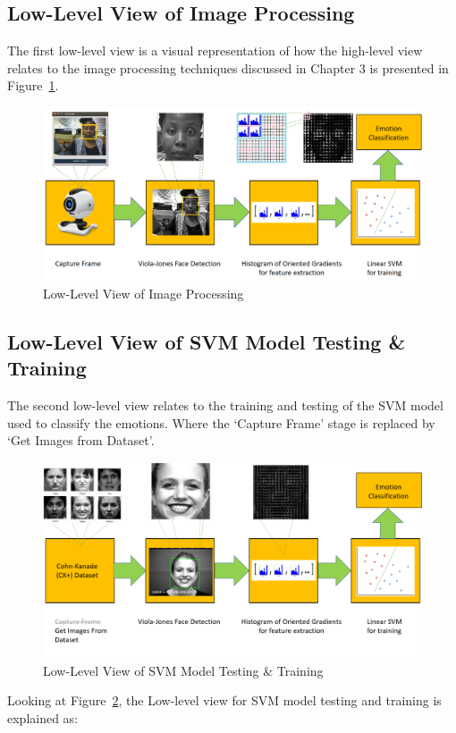 \subsection{Low-Level View of Image Processing}

The first low-level view is a visual representation of how the high-level view relates to the image processing techniques discussed in Chapter 3 is presented in Figure~\ref{fig: lowlevel}. 
\begin{figure}[H]
  \centering
  \includegraphics[scale=0.2]{pres2}
  \caption{Low-Level View of Image Processing}
  \label{fig: lowlevel}
\end{figure} 

\subsection{Low-Level View of SVM Model Testing \& Training}

The second low-level view relates to the training and testing of the SVM model used to classify the emotions. Where the `Capture Frame' stage is replaced by `Get Images from Dataset'.
\begin{figure}[H]
  \centering
  \includegraphics[scale=0.65]{second}
  \caption{Low-Level View of SVM Model Testing \& Training}
  \label{fig: lowlevel2}
\end{figure} 
Looking at Figure~\ref{fig: lowlevel2}, the Low-level view for SVM model testing and training is explained as:


